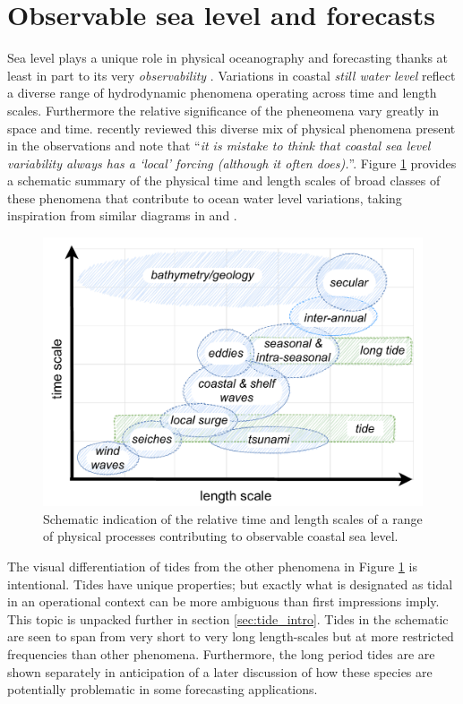 \section{Observable sea level and forecasts}

Sea level plays a unique role in physical oceanography and forecasting thanks at least in part to its very \emph{observability} \citep{Wilson:2010hy}. 
Variations in coastal \emph{still water level} \citep{Pugh:2014di} reflect a diverse range of hydrodynamic phenomena operating across time and length scales.   Furthermore the relative significance of the pheneomena vary greatly in space and time.
\citet{10.1007/s10712-019-09531-1} recently reviewed this diverse mix of physical phenomena present in the observations and note that ``\textit{it is mistake to think that coastal sea level variability always has a ‘local’ forcing (although it often does).}''. 
Figure \ref{fig:sealevelScales} provides a schematic summary of the physical time and length scales of broad classes of these phenomena that contribute to ocean water level variations, taking inspiration from similar diagrams in \citet{10.1007/s10712-019-09531-1} and \citet{Chelton:2001ws}.
\begin{figure}[H]\centering
  \includegraphics[width=\figwidthFull]{figures/diagrams/scales_time_length.pdf}
  \caption{Schematic indication of the relative time and length scales of a range of physical processes contributing to observable coastal sea level.}
  \label{fig:sealevelScales}
\end{figure}
The visual differentiation of tides from the other phenomena in Figure \ref{fig:sealevelScales} is intentional.  Tides have unique properties; but exactly what is designated as tidal in an operational context can be more ambiguous than first impressions imply. This topic is unpacked further in section \ref{sec:tide_intro}. Tides in the schematic are seen to span from very short to very long length-scales but at more restricted frequencies than other phenomena.    Furthermore, the long period tides are are shown separately in anticipation of a later discussion of how these species are potentially problematic in some forecasting applications.

